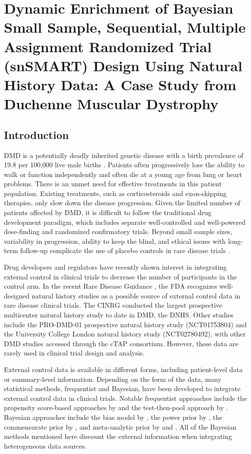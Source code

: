 \chapter{Dynamic Enrichment of Bayesian Small Sample, Sequential, Multiple Assignment Randomized Trial (snSMART) Design Using Natural History Data: A Case Study from Duchenne Muscular Dystrophy}
\label{chpt:chpt2}

\section{Introduction}
\label{s:intro}
\ac{DMD} is a potentially deadly inherited genetic disease with a birth prevalence of 19.8 per 100,000 live male births \citep{crisafulli2020global}. Patients often progressively lose the ability to walk or function independently and often die at a young age from lung or heart problems. There is an unmet need for effective treatments in this patient population. Existing treatments, such as corticosteroids and exon-skipping therapies, only slow down the disease progression. Given the limited number of patients affected by \ac{DMD}, it is difficult to follow the traditional drug development paradigm, which includes separate well-controlled and well-powered dose-finding and randomized confirmatory trials. Beyond small sample sizes, variability in progression, ability to keep the blind, and ethical issues with long-term follow-up complicate the use of placebo controls in rare disease trials \citep{MUNTONI2022271}. 

Drug developers and regulators have recently shown interest in integrating external control in clinical trials to decrease the number of participants in the control arm. In the recent Rare Disease Guidance \citeyearpar{fda}, the \ac{FDA} recognizes well-designed natural history studies as a possible source of external control data in rare disease clinical trials. The \ac{CINRG} conducted the largest prospective multicenter natural history study to date in \ac{DMD}, the \ac{DNHS}. Other studies include the PRO-DMD-01 prospective natural history study (NCT01753804) and the University College London natural history study (NCT02780492), with other \ac{DMD} studies accessed through the \ac{cTAP} consortium. However, these data are rarely used in clinical trial design and analysis.

External control data is available in different forms, including patient-level data or summary-level information. Depending on the form of the data, many statistical methods, frequentist and Bayesian, have been developed to integrate external control data in clinical trials. Notable frequentist approaches include the propensity score-based approaches by \cite{rosenbaum1983central} and the test-then-pool approach by \cite{viele2014use}. Bayesian approaches include the bias model by \cite{pocock1976combination}, the power prior by \cite{ibrahim2000power}, the commensurate prior by \cite{hobbs2011hierarchical}, and meta-analytic prior by \cite{spiegelhalter2004bayesian, neuenschwander2010summarizing, schmidli2014robust} and \cite{neuenschwander2016use}. All of the Bayesian methods mentioned here discount the external information when integrating heterogeneous data sources.
 

